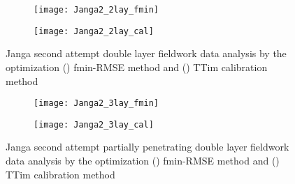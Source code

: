 \begin{figure}[h!]
	\centering
	\begin{subfigure}[b]{0.64\linewidth}
		\centering\texttt{[image: Janga2\_2lay\_fmin]}
		\captionsetup{justification=centering}		
		\caption{\label{fig:Janga2_2lay_fmin}}
		\end{subfigure}\vfill
	\begin{subfigure}[b]{0.64\linewidth}
		\centering\texttt{[image: Janga2\_2lay\_cal]}
		\captionsetup{justification=centering}		
		\caption{\label{fig:Janga2_2lay_cal}}
		\end{subfigure}
	\captionsetup{justification=centering}	
	\caption{Janga second attempt double layer fieldwork data analysis by the optimization () fmin-RMSE method and () TTim calibration method} 
	\label{fig:Janga2_2lay_analysis}
\end{figure} 

\begin{figure}[h!]
	\centering
	\begin{subfigure}[b]{0.64\linewidth}
		\centering\texttt{[image: Janga2\_3lay\_fmin]}
		\captionsetup{justification=centering}		
		\caption{\label{fig:Janga2_3lay_fmin}}
		\end{subfigure}\vfill
	\begin{subfigure}[b]{0.64\linewidth}
		\centering\texttt{[image: Janga2\_3lay\_cal]}
		\captionsetup{justification=centering}		
		\caption{\label{fig:Janga2_3lay_cal}}
		\end{subfigure}
	\captionsetup{justification=centering}	
	\caption{Janga second attempt partially penetrating double layer fieldwork data analysis by the optimization () fmin-RMSE method and () TTim calibration method} 
	\label{fig:Janga2_3lay_analysis}
\end{figure} 

\clearpage

